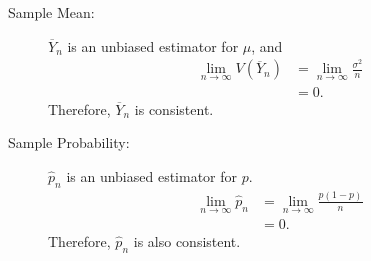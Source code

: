 \documentclass[10pt]{extarticle}
\begin{document}
  \begin{description}
    \item[Sample Mean:] $\overline{Y}_n$ is an unbiased estimator for $\mu$, and
      \begin{align*}
        \lim_{n\rightarrow \infty}V(\overline{Y}_n)  &= \lim_{n\rightarrow\infty}\frac{\sigma^2}{n}\\
                                                     &= 0.
      \end{align*}
      Therefore, $\overline{Y}_{n}$ is consistent.
    \item[Sample Probability:] $\hat{p}_n$ is an unbiased estimator for $p$.
      \begin{align*}
        \lim_{n\rightarrow\infty} \hat{p}_{n} &= \lim_{n\rightarrow\infty}\frac{p(1-p)}{n}\\
                                              &= 0.
      \end{align*}
      Therefore, $\hat{p}_n$ is also consistent.
  \end{description}
\end{document}
